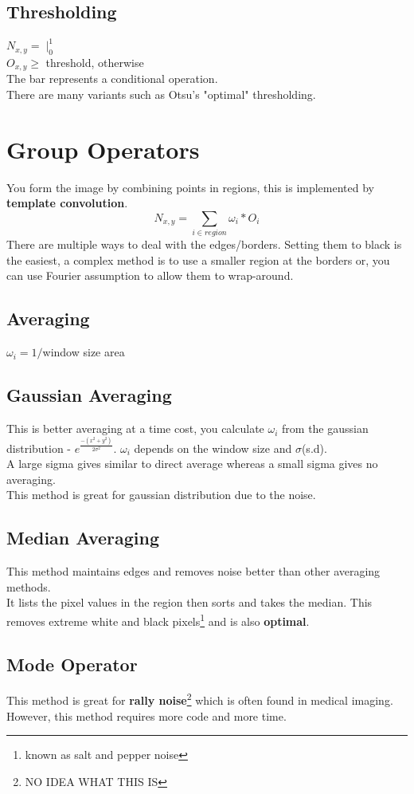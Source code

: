 \documentclass{article}
\begin{document}
	\subsection{Thresholding}
	$N_{x,y}=\mid_0^1$\\
	$O_{x,y}\geq$ threshold, otherwise\\
	The bar represents a conditional operation.\\
	There are many variants such as Otsu's "optimal" thresholding.
	\section{Group Operators}
	You form the image by combining points in regions, this is implemented by \textbf{template convolution}.
	$$N_{x,y}=\sum_{i\in region}\omega_i*O_i$$
	There are multiple ways to deal with the edges/borders. Setting them to black is the easiest, a complex method is to use a smaller region at the borders or, you can use Fourier assumption to allow them to wrap-around.
	\subsection{Averaging}
	$\omega_i=1/$window size area
	\subsection{Gaussian Averaging}
	This is better averaging at a time cost, you calculate $\omega_i$ from the gaussian distribution - $e^{\frac{-(x^2+y^2)}{2\sigma^2}}$. $\omega_i$ depends on the window size and $\sigma$(s.d).\\
	A large sigma gives similar to direct average whereas a small sigma gives no averaging.\\
	This method is great for gaussian distribution due to the noise.
	\subsection{Median Averaging}
	This method maintains edges and removes noise better than other averaging methods.\\
	It lists the pixel values in the region then sorts and takes the median. This removes extreme white and black pixels\footnote{known as salt and pepper noise} and is also \textbf{optimal}.
	\subsection{Mode Operator}
	This method is great for \textbf{rally noise}\footnote{NO IDEA WHAT THIS IS} which is often found in medical imaging. However, this method requires more code and more time.
\end{document}
